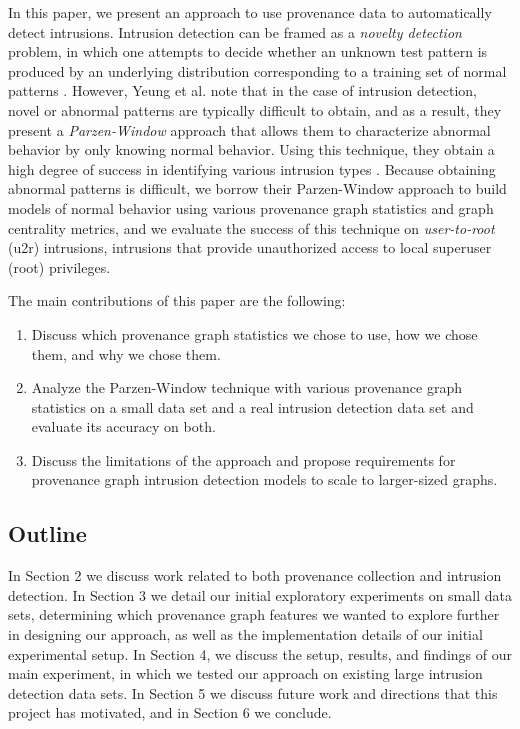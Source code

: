 \documentclass[10pt,twocolumn]{article}
\begin{document}
In this paper, we present an approach to use provenance data to automatically detect intrusions. Intrusion
detection can be framed as a {\em novelty detection} problem, in which one attempts to decide whether
an unknown test pattern is produced by an underlying distribution corresponding to a training set
of normal patterns \cite{parzen}. However, Yeung et al. note that in the case of intrusion detection, novel
or abnormal patterns are typically difficult to obtain, and as a result, they present a {\em Parzen-Window} approach that allows them to characterize abnormal behavior by only knowing normal behavior.
Using this technique, they obtain a high degree of success
in identifying various intrusion types \cite{parzen}. Because obtaining abnormal patterns is difficult, 
we borrow their Parzen-Window approach to build models of normal behavior using 
various provenance graph statistics and graph centrality metrics, and we evaluate the success of this technique
on {\em user-to-root} (u2r) intrusions, intrusions that provide unauthorized access to local superuser (root) privileges.

The main contributions of this paper are the following:
\begin{enumerate}
\item Discuss which provenance graph statistics we chose to use, how we chose them, and why we chose them.
\item Analyze the Parzen-Window technique with various provenance graph statistics on a small data set and a real intrusion detection data set and evaluate its accuracy on both.
\item Discuss the limitations of the approach and propose requirements for provenance graph intrusion detection models to scale to larger-sized graphs.
\end{enumerate}

\subsection{Outline}
In Section 2 we discuss work related to both provenance collection and intrusion detection. In Section 3 we detail our initial exploratory experiments on small data sets, determining which provenance graph features we wanted to explore further in designing our approach, as well as the implementation details of our initial experimental setup. In Section 4, we discuss the setup, results, and findings of our main experiment, in which we tested our approach on existing large intrusion detection data sets. In Section 5 we discuss future work and directions that this project has motivated, and in Section 6 we conclude.
\end{document}
